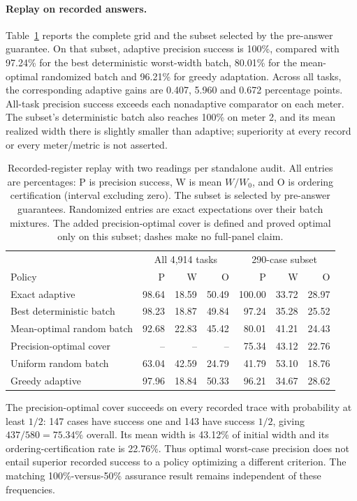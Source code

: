 \paragraph{Replay on recorded answers.}
Table~\ref{tab:counter-replay} reports the complete grid and the subset
selected by the pre-answer guarantee. On that subset, adaptive precision
success is 100\%, compared with 97.24\% for the best deterministic
worst-width batch, 80.01\% for the mean-optimal randomized batch and 96.21\%
for greedy adaptation. Across all tasks, the corresponding adaptive gains
are 0.407, 5.960 and 0.672 percentage points. All-task precision success
exceeds each nonadaptive comparator on each meter. The subset's
deterministic batch also reaches 100\% on meter 2, and its mean realized
width there is slightly smaller than adaptive; superiority at every
record or every meter/metric is not asserted.

\begin{table}[htbp]\centering\small\setlength{\tabcolsep}{4pt}
\caption{Recorded-register replay with two readings per standalone audit.
All entries are percentages: P is precision success, W is mean $W/W_0$,
and O is ordering certification (interval excluding zero). The subset is
selected by pre-answer guarantees. Randomized entries are exact expectations
over their batch mixtures. The added precision-optimal cover is defined and
proved optimal only on this subset; dashes make no full-panel claim.}
\label{tab:counter-replay}
\begin{tabular}{lrrrrrr}\toprule
 & \multicolumn{3}{c}{All 4,914 tasks} & \multicolumn{3}{c}{290-case subset}\\
Policy & P & W & O & P & W & O\\\midrule
Exact adaptive & 98.64 & 18.59 & 50.49 & 100.00 & 33.72 & 28.97\\
Best deterministic batch & 98.23 & 18.87 & 49.84 & 97.24 & 35.28 & 25.52\\
Mean-optimal random batch & 92.68 & 22.83 & 45.42 & 80.01 & 41.21 & 24.43\\
Precision-optimal cover & -- & -- & -- & 75.34 & 43.12 & 22.76\\
Uniform random batch & 63.04 & 42.59 & 24.79 & 41.79 & 53.10 & 18.76\\
Greedy adaptive & 97.96 & 18.84 & 50.33 & 96.21 & 34.67 & 28.62\\
\bottomrule\end{tabular}\end{table}

The precision-optimal cover succeeds on every recorded trace with
probability at least $1/2$: 147 cases have success one and 143 have
success $1/2$, giving $437/580=75.34\%$ overall. Its mean width is
43.12\% of initial width and its ordering-certification rate is 22.76\%.
Thus optimal worst-case precision does not entail superior recorded
success to a policy optimizing a different criterion. The matching
100\%-versus-50\% assurance result remains independent of these frequencies.


